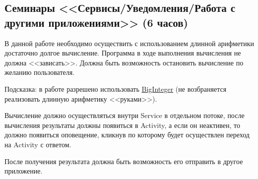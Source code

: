 \subsection{Семинары <<Сервисы/Уведомления/Работа с другими приложениями>> (6 часов)}

В данной работе необходимо осуществить с использованием длинной арифметики достаточно долгое вычисление. 
Программа в ходе выполнения вычисления не должна <<зависать>>. 
Должна быть возможность остановить вычисление по желанию пользователя. 

Подсказка: в работе разрешено использовать \href{https://developer.android.com/reference/java/math/BigInteger}{BigInteger} (не возбраняется реализовать длинную арифметику <<руками>>).

Вычисление должно осуществляться внутри Service в отдельном потоке, после вычисления результаты должны появиться в Activity, а если он неактивен, то должно
появиться оповещение, кликнув по которому будет осуществлен переход на Activity с ответом.

После получения результата должна быть возможность его отправить в другое приложение. 


